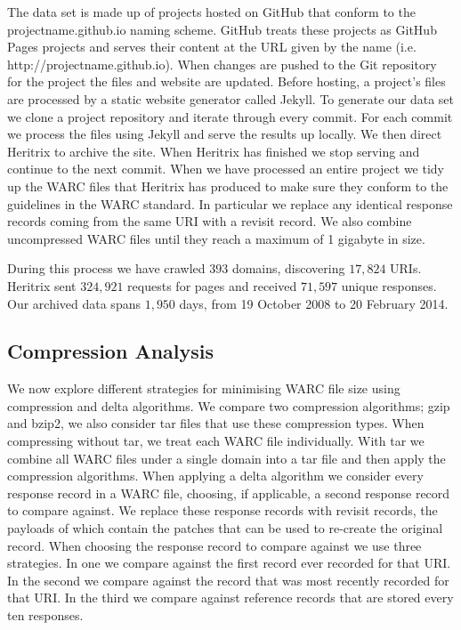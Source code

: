 \documentclass[11pt]{article}
\def \domainscrawled {393}
\def \uniqueuris {17,824}
\def \requestssent {324,921}
\def \uniqueresponses {71,597}
\def \oldestpage {19 October 2008}
\def \youngestpage {20 February 2014}
\def \totaldays {1,950}
\begin{document}
    The data set is made up of projects hosted on GitHub that conform to the projectname.github.io naming scheme. GitHub treats these projects as GitHub Pages projects and serves their content at the URL given by the name (i.e. http://projectname.github.io). When changes are pushed to the Git repository for the project the files and website are updated. Before hosting, a project's files are processed by a static website generator called Jekyll\footnotemark. To generate our data set we clone a project repository and iterate through every commit. For each commit we process the files using Jekyll and serve the results up locally. We then direct Heritrix to archive the site. When Heritrix has finished we stop serving and continue to the next commit. When we have processed an entire project we tidy up the WARC files that Heritrix has produced to make sure they conform to the guidelines in the WARC standard. In particular we replace any identical response records coming from the same URI with a revisit record. We also combine uncompressed WARC files until they reach a maximum of 1 gigabyte in size.

    During this process we have crawled $\domainscrawled$ domains, discovering $\uniqueuris$ URIs. Heritrix sent $\requestssent$ requests for pages and received $\uniqueresponses$ unique responses. Our archived data spans $\totaldays$ days, from \oldestpage{} to \youngestpage.



  \subsection{Compression Analysis}

    We now explore different strategies for minimising WARC file size using compression and delta algorithms. We compare two compression algorithms; gzip and bzip2, we also consider tar files that use these compression types. When compressing without tar, we treat each WARC file individually. With tar we combine all WARC files under a single domain into a tar file and then apply the compression algorithms. When applying a delta algorithm we consider every response record in a WARC file, choosing, if applicable, a second response record to compare against. We replace these response records with revisit records, the payloads of which contain the patches that can be used to re-create the original record. When choosing the response record to compare against we use three strategies. In one we compare against the first record ever recorded for that URI. In the second we compare against the record that was most recently recorded for that URI. In the third we compare against reference records that are stored every ten responses.
\end{document}
